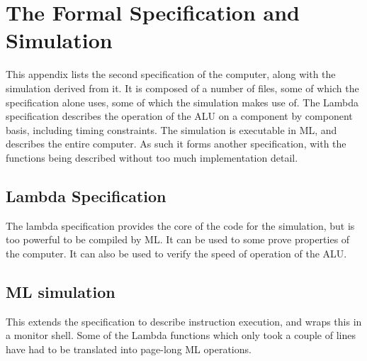 
\chapter{The Formal Specification and Simulation}

This appendix lists the second specification of the computer,
along with the simulation derived from it.
It is composed of a number of files, some of which the specification alone
uses, some of which the simulation makes use of.
The Lambda specification describes the operation of the ALU on a  component by component basis, including timing constraints.
The simulation is executable in ML, and describes the entire computer.
As such it forms another specification, with the functions being described without too much implementation detail.

\section{Lambda Specification}
The lambda specification provides the core of the code for the simulation, but is too powerful to be compiled by ML.
It can be used to some prove properties of the computer.
It can also be used to verify the speed of operation of the ALU.








\section{ML simulation}
This extends the specification to describe instruction execution,
and wraps this in a monitor shell.
Some of the Lambda functions which only took a couple of lines have had to be translated into page-long ML operations.







